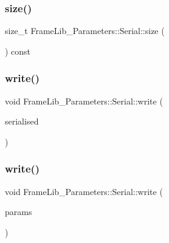 \subsubsection{\texorpdfstring{size()}{size()}}
{\footnotesize\ttfamily size\+\_\+t Frame\+Lib\+\_\+\+Parameters\+::\+Serial\+::size (\begin{DoxyParamCaption}{ }\end{DoxyParamCaption}) const\hspace{0.3cm}{\ttfamily [inline]}}

\mbox{\label{class_frame_lib___parameters_1_1_serial_acc45d51259fea82f898550856e79a493}} 
\subsubsection{\texorpdfstring{write()}{write()}\hspace{0.1cm}{\footnotesize\ttfamily [1/5]}}
{\footnotesize\ttfamily void Frame\+Lib\+\_\+\+Parameters\+::\+Serial\+::write (\begin{DoxyParamCaption}\item[{const \hyperlink{class_frame_lib___parameters_1_1_serial}{Serial} $\ast$}]{serialised }\end{DoxyParamCaption})}

\mbox{\label{class_frame_lib___parameters_1_1_serial_a8b9707ad07ecb67ee347d9d07ab6e6e3}} 
\subsubsection{\texorpdfstring{write()}{write()}\hspace{0.1cm}{\footnotesize\ttfamily [2/5]}}
{\footnotesize\ttfamily void Frame\+Lib\+\_\+\+Parameters\+::\+Serial\+::write (\begin{DoxyParamCaption}\item[{const \hyperlink{class_frame_lib___parameters}{Frame\+Lib\+\_\+\+Parameters} $\ast$}]{params }\end{DoxyParamCaption})}

